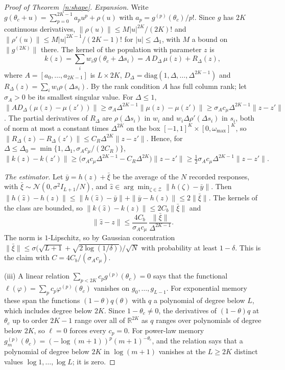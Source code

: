 \begin{proof}[Proof of Theorem~\ref{n:shape}]
\emph{Expansion.} Write $g(\theta_c+u)=\sum_{p=0}^{2K-1}a_pu^p+\rho(u)$ with $a_p=g^{(p)}(\theta_c)/p!$. Since $g$ has $2K$ continuous derivatives, $\|\rho(u)\|\le M|u|^{2K}/(2K)!$ and $\|\rho'(u)\|\le M|u|^{2K-1}/(2K-1)!$ for $|u|\le\Delta_1$, with $M$ a bound on $\|g^{(2K)}\|$ there. The kernel of the population with parameter $z$ is
\[
k(z)=\sum_iw_ig(\theta_c+\Delta s_i)=A\,D_\Delta\,\mu(z)+R_\Delta(z),
\]
where $A=[a_0,\ldots,a_{2K-1}]$ is $L\times2K$, $D_\Delta=\mathrm{diag}(1,\Delta,\ldots,\Delta^{2K-1})$ and $R_\Delta(z)=\sum_iw_i\rho(\Delta s_i)$. By the rank condition $A$ has full column rank; let $\sigma_A>0$ be its smallest singular value. For $\Delta\le1$, $\|AD_\Delta(\mu(z)-\mu(z'))\|\ge\sigma_A\Delta^{2K-1}\|\mu(z)-\mu(z')\|\ge\sigma_Ac_\mu\Delta^{2K-1}\|z-z'\|$. The partial derivatives of $R_\Delta$ are $\rho(\Delta s_i)$ in $w_i$ and $w_i\Delta\rho'(\Delta s_i)$ in $s_i$, both of norm at most a constant times $\Delta^{2K}$ on the box $[-1,1]^K\times[0,\omega_{\max}]^K$, so $\|R_\Delta(z)-R_\Delta(z')\|\le C_R\Delta^{2K}\|z-z'\|$. Hence, for $\Delta\le\Delta_0=\min\{1,\Delta_1,\sigma_Ac_\mu/(2C_R)\}$,
\[
\|k(z)-k(z')\|\ge\big(\sigma_Ac_\mu\Delta^{2K-1}-C_R\Delta^{2K}\big)\|z-z'\|\ge\tfrac12\sigma_Ac_\mu\Delta^{2K-1}\|z-z'\|.
\]

\emph{The estimator.} Let $\bar y=h(z)+\bar\xi$ be the average of the $N$ recorded responses, with $\bar\xi\sim\mathcal N(0,\sigma^2I_{L+1}/N)$, and $\hat z\in\arg\min_{\zeta\in\mathcal Z}\|h(\zeta)-\bar y\|$. Then $\|h(\hat z)-h(z)\|\le\|h(\hat z)-\bar y\|+\|\bar y-h(z)\|\le2\|\bar\xi\|$. The kernels of the class are bounded, so $\|k(\hat z)-k(z)\|\le2C_b\|\bar\xi\|$ and
\[
\|\hat z-z\|\le\frac{4C_b}{\sigma_Ac_\mu}\,\frac{\|\bar\xi\|}{\Delta^{2K-1}}.
\]
The norm is $1$-Lipschitz, so by Gaussian concentration $\|\bar\xi\|\le\sigma\big(\sqrt{L+1}+\sqrt{2\log(1/\delta)}\big)/\sqrt N$ with probability at least $1-\delta$. This is the claim with $C=4C_b/(\sigma_Ac_\mu)$.

(iii) A linear relation $\sum_{p<2K}c_pg^{(p)}(\theta_c)=0$ says that the functional $\ell(\varphi)=\sum_pc_p\varphi^{(p)}(\theta_c)$ vanishes on $g_0,\ldots,g_{L-1}$. For exponential memory these span the functions $(1-\theta)q(\theta)$ with $q$ a polynomial of degree below $L$, which includes degree below $2K$. Since $1-\theta_c\ne0$, the derivatives of $(1-\theta)q$ at $\theta_c$ up to order $2K-1$ range over all of $\mathbb R^{2K}$ as $q$ ranges over polynomials of degree below $2K$, so $\ell=0$ forces every $c_p=0$. For power-law memory $g_m^{(p)}(\theta_c)=(-\log(m+1))^p(m+1)^{-\theta_c}$, and the relation says that a polynomial of degree below $2K$ in $\log(m+1)$ vanishes at the $L\ge2K$ distinct values $\log1,\ldots,\log L$; it is zero.
\end{proof}

